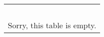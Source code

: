 \begin{longtable}{rl}
\hline
\multicolumn{2}{l}{\ }\\
\multicolumn{2}{l}{Sorry, this table is empty.}\\
\hline
\end{longtable}
